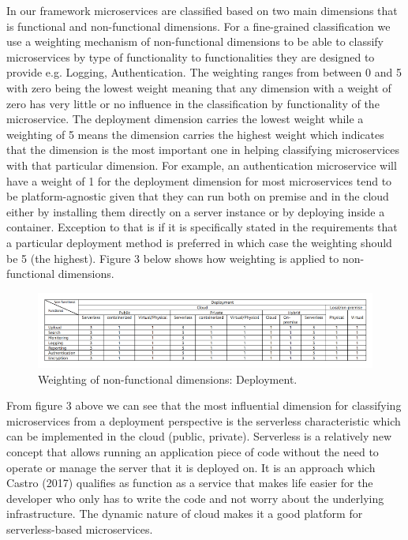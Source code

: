 \documentclass{article}
\begin{document}
In our framework microservices are classified based on two main dimensions that is functional and non-functional dimensions. For a fine-grained classification we use a weighting mechanism of non-functional dimensions to be able to classify microservices by type of functionality to functionalities they are designed to provide e.g. Logging, Authentication. The weighting ranges from between 0 and 5 with zero being the lowest weight meaning that any dimension with a weight of zero has very little or no influence in the classification by functionality of the microservice. The deployment dimension carries the lowest weight while a weighting of 5 means the dimension carries the highest weight which indicates that the dimension is the most important one in helping classifying microservices with that particular dimension. For example, an authentication microservice will have a weight of 1 for the deployment dimension for most microservices tend to be platform-agnostic given that they can run both on premise and in the cloud either by installing them directly on a server instance or by deploying inside a container. Exception to that is if it is specifically stated in the requirements that a particular deployment method is preferred in which case the weighting should be 5 (the highest). Figure 3 below shows how weighting is applied to non-functional dimensions.

\begin{figure}[h!]
\includegraphics{table5.png}
\caption{Weighting of non-functional dimensions: Deployment.}
\end{figure}

From figure 3 above we can see that the most influential dimension for classifying microservices from a deployment perspective is the serverless characteristic which can be implemented in the cloud (public, private). Serverless is a relatively new concept that allows running an application piece of code without the need to operate or manage the server that it is deployed on. It is an approach which Castro (2017) qualifies as function as a service that makes life easier for the developer who only has to write the code and not worry about the underlying infrastructure. The dynamic nature of cloud makes it a good platform for serverless-based microservices. 
\end{document}
